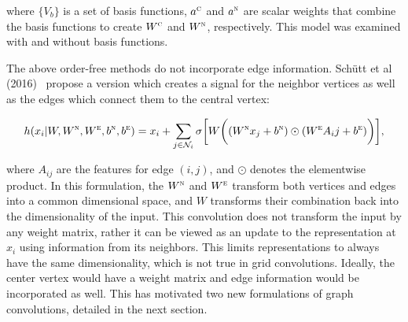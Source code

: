 \noindent
where $\{V_b\}$ is a set of basis functions, $a^\textsc{c}$ and $a^\textsc{n}$ are scalar weights that combine the basis functions to create $W^\textsc{c}$ and $W^\textsc{n}$, respectively.
This model was examined with and without basis functions.

The above order-free methods do not incorporate edge information.
Sch{\"u}tt et al (2016)~\cite{schutt2017} propose a version which creates a signal for the neighbor vertices as well as the edges which connect them to the central vertex:

\begin{equation}
h(x_i | W, W^\textsc{n}, W^\textsc{e}, b^\textsc{n}, b^\textsc{e})= x_i + \sum_{j \in \mathcal{N}_i} \sigma \bigg[ W \bigg( (W^\textsc{n} x_j + b^\textsc{n}) \odot (W^\textsc{e} A_ij + b^\textsc{e}) \bigg) \bigg],
\label{eq:deep_tensor}
\end{equation}

\noindent
where $A_{ij}$ are the features for edge $(i, j)$, and $\odot$ denotes the elementwise product.
In this formulation, the $W^\textsc{n}$ and $W^\textsc{e}$ transform both vertices and edges into a common dimensional space, and $W$ transforms their combination back into the dimensionality of the input. 
This convolution does not transform the input by any weight matrix, rather it can be viewed as an update to the representation at $x_i$ using information from its neighbors.
This limits representations to always have the same dimensionality, which is not true in grid convolutions. 
Ideally, the center vertex would have a weight matrix and edge information would be incorporated as well.
This has motivated two new formulations of graph convolutions, detailed in the next section.


